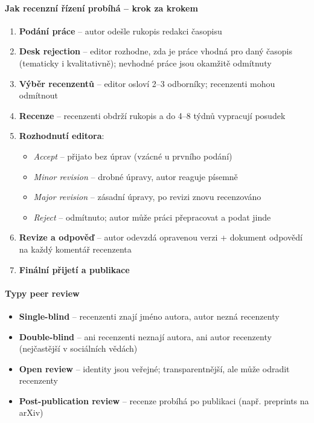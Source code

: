 \paragraph{Jak recenzní řízení probíhá -- krok za krokem}
\begin{enumerate}
  \item \textbf{Podání práce} -- autor odešle rukopis redakci časopisu
  \item \textbf{Desk rejection} -- editor rozhodne, zda je práce vhodná pro daný časopis (tematicky i kvalitativně); nevhodné práce jsou okamžitě odmítnuty
  \item \textbf{Výběr recenzentů} -- editor osloví 2--3 odborníky; recenzenti mohou odmítnout
  \item \textbf{Recenze} -- recenzenti obdrží rukopis a do 4--8 týdnů vypracují posudek
  \item \textbf{Rozhodnutí editora}:
    \begin{itemize}
      \item \textit{Accept} -- přijato bez úprav (vzácné u prvního podání)
      \item \textit{Minor revision} -- drobné úpravy, autor reaguje písemně
      \item \textit{Major revision} -- zásadní úpravy, po revizi znovu recenzováno
      \item \textit{Reject} -- odmítnuto; autor může práci přepracovat a podat jinde
    \end{itemize}
  \item \textbf{Revize a odpověď} -- autor odevzdá opravenou verzi + dokument odpovědí na každý komentář recenzenta
  \item \textbf{Finální přijetí a publikace}
\end{enumerate}

\paragraph{Typy peer review}
\begin{itemize}
  \item \textbf{Single-blind} -- recenzenti znají jméno autora, autor nezná recenzenty
  \item \textbf{Double-blind} -- ani recenzenti neznají autora, ani autor recenzenty (nejčastější v sociálních vědách)
  \item \textbf{Open review} -- identity jsou veřejné; transparentnější, ale může odradit recenzenty
  \item \textbf{Post-publication review} -- recenze probíhá po publikaci (např. preprints na arXiv)
\end{itemize}

